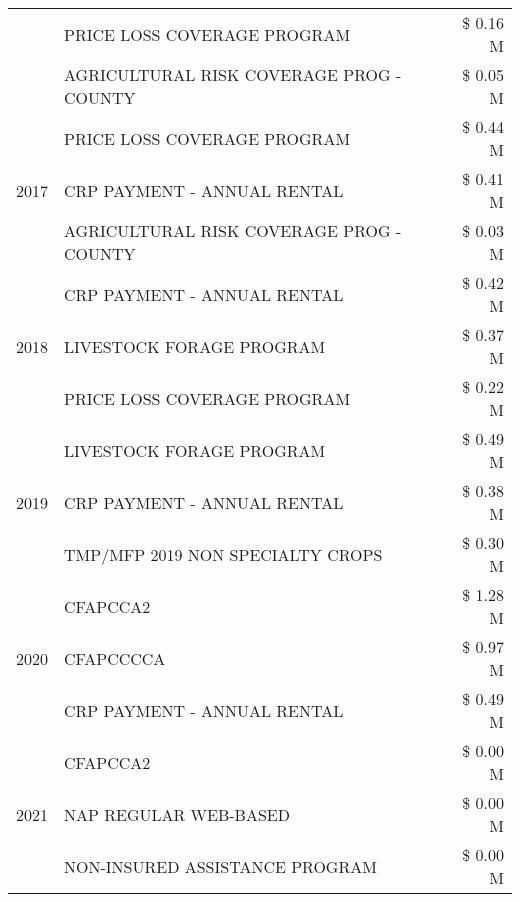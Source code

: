 \begin{tabular}{llr}
 & PRICE LOSS COVERAGE PROGRAM                   & \$ 0.16 M \\
 & AGRICULTURAL RISK COVERAGE PROG - COUNTY      & \$ 0.05 M \\
\cline{1-3}
\multirow[t]{3}{*}{2017} & PRICE LOSS COVERAGE PROGRAM & \$ 0.44 M \\
 & CRP PAYMENT - ANNUAL RENTAL & \$ 0.41 M \\
 & AGRICULTURAL RISK COVERAGE PROG - COUNTY & \$ 0.03 M \\
\cline{1-3}
\multirow[t]{3}{*}{2018} & CRP PAYMENT - ANNUAL RENTAL & \$ 0.42 M \\
 & LIVESTOCK FORAGE PROGRAM & \$ 0.37 M \\
 & PRICE LOSS COVERAGE PROGRAM & \$ 0.22 M \\
\cline{1-3}
\multirow[t]{3}{*}{2019} & LIVESTOCK FORAGE PROGRAM & \$ 0.49 M \\
 & CRP PAYMENT - ANNUAL RENTAL & \$ 0.38 M \\
 & TMP/MFP 2019 NON SPECIALTY CROPS & \$ 0.30 M \\
\cline{1-3}
\multirow[t]{3}{*}{2020} & CFAPCCA2 & \$ 1.28 M \\
 & CFAPCCCCA & \$ 0.97 M \\
 & CRP PAYMENT - ANNUAL RENTAL & \$ 0.49 M \\
\cline{1-3}
\multirow[t]{3}{*}{2021} & CFAPCCA2 & \$ 0.00 M \\
 & NAP REGULAR WEB-BASED & \$ 0.00 M \\
 & NON-INSURED ASSISTANCE PROGRAM & \$ 0.00 M \\
\cline{1-3}
\bottomrule
\end{tabular}
